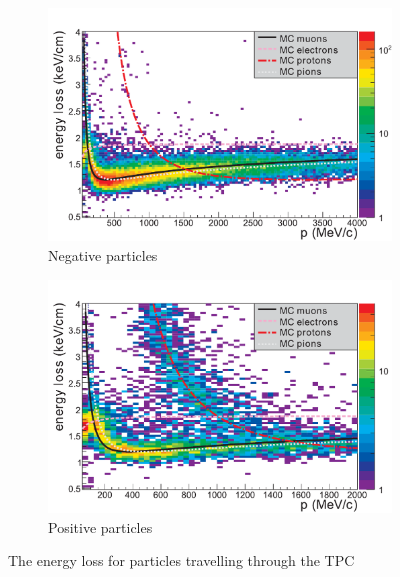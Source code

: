 \begin{figure}[h]
	\begin{subfigure}[t]{0.49\textwidth}
		\includegraphics[width=\textwidth]{figures/numu/TPC_PID_neg}
		\caption{Negative particles}
	\end{subfigure}
	\begin{subfigure}[t]{0.49\textwidth}
		\includegraphics[width=\textwidth]{figures/numu/TPC_PID_pos}
		\caption{Positive particles}
	\end{subfigure}
	\caption{The energy loss for particles travelling through the TPC}
	\label{fig:TPC_dedx}
\end{figure}

